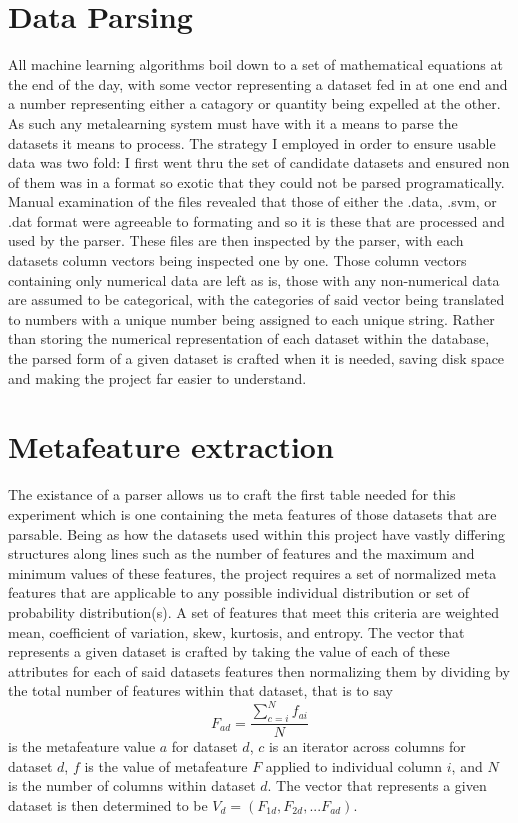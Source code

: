 \section{Data Parsing}
All machine learning algorithms boil down to a set of mathematical equations at
the end of the day, with some vector representing a dataset fed in at one end
and a number representing either a catagory or quantity being expelled at the
other. As such any metalearning system must have with it a means to parse the
datasets it means to process. The strategy I employed in order to ensure usable
data was two fold: I first went thru the set of candidate datasets and ensured
non of them was in a format so exotic that they could not be parsed
programatically. Manual examination of the files revealed that those of either
the .data, .svm, or .dat format were agreeable to formating and so it is these
that are processed and used by the parser. These files are then inspected by the
parser, with each datasets column vectors being inspected one by one. Those
column vectors containing only numerical data are left as is, those with any
non-numerical data are assumed to be categorical, with the categories of said
vector being translated to numbers with a unique number being assigned to each
unique string. Rather than storing the numerical representation of each dataset
within the database, the parsed form of a given dataset is crafted when it is
needed, saving disk space and making the project far easier to understand.

\section{Metafeature extraction}
The existance of a parser allows us to craft the first table needed for this
experiment which is one containing the meta features of those datasets that are
parsable. Being as how the datasets used within this project have vastly
differing structures along lines such as the number of features and the maximum
and minimum values of these features, the project requires a set of normalized
meta features that are applicable to any possible individual distribution or set
of probability distribution(s). A set of features that meet this criteria are
weighted mean, coefficient of variation, skew, kurtosis, and entropy. The vector
that represents a given dataset is crafted by taking the value of each of these
attributes for each of said datasets features then normalizing them by dividing
by the total number of features within that dataset, that is to say
$$F_{ad} = \frac{\sum_{c=i}^{N}f_{ai}}{N}$$
is the metafeature value $a$ for dataset $d$, $c$ is an iterator across columns
for dataset $d$, $f$ is the value of metafeature $F$ applied to individual
column $i$, and $N$ is the number of columns within dataset $d$. The vector that
represents a given dataset is then determined to be
$V_d = (F_{1d}, F_{2d},...F_{ad})$.

